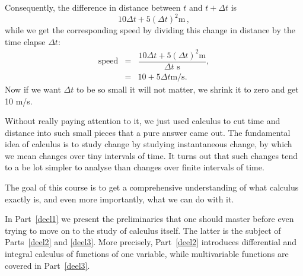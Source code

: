 Consequently, the difference in distance between $t$ and $t+\Delta t$ is
$$
10\Delta t + 5(\Delta t)^2 \text{m}\,,
$$
while we get the corresponding speed by dividing this change in distance by the time elapse $\Delta t$:
\begin{eqnarray*}
\text{speed}&=&\dfrac{10\Delta t + 5(\Delta t)^2 \text{m}}{\Delta t\text{ s}},\\
&=&10 + 5\Delta t \text{m/s}.
\end{eqnarray*}
Now if  we want $\Delta t$ to be so small it will not matter, we shrink it to zero and  get 10 m/s. 

Without really paying attention to it, we just used  calculus to cut time and distance into such small pieces that a pure answer came out. The fundamental idea of calculus is to study change by studying instantaneous change, by which we mean changes over tiny intervals of time.  It turns out that such changes tend to a be lot simpler to analyse than changes over finite intervals of time.

The goal of this course is to get a comprehensive understanding of what calculus exactly is, and even more importantly, what we can do with it. 

In Part~\ref{deel1} we present the preliminaries that one should master before even trying to move on to the study of calculus itself. The latter is the subject of Parts~\ref{deel2} and \ref{deel3}. More precisely, Part~\ref{deel2} introduces differential and integral calculus of functions of one variable, while multivariable functions are covered in Part~\ref{deel3}. 
